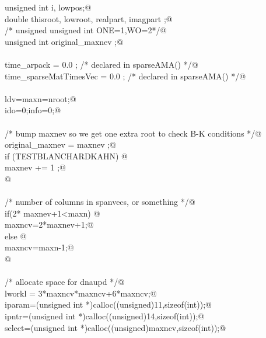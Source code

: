 \documentclass[12pt]{article}
\begin{document}
\begin{flushleft}
\begin{minipage}{\linewidth}
\begin{list}{}{}
\mbox{}\verb@        unsigned int i, lowpos;@\\
\mbox{}\verb@        double thisroot, lowroot, realpart, imagpart ;@\\
\mbox{}\verb@/*      unsigned unsigned int ONE=1,WO=2*/@\\
\mbox{}\verb@        unsigned int original_maxnev ;@\\
\mbox{}\verb@@\\
\mbox{}\verb@        time_arpack = 0.0 ;                             /* declared in sparseAMA() */@\\
\mbox{}\verb@        time_sparseMatTimesVec = 0.0 ;  /* declared in sparseAMA() */@\\
\mbox{}\verb@@\\
\mbox{}\verb@        ldv=maxn=nroot;@\\
\mbox{}\verb@        ido=0;info=0;@\\
\mbox{}\verb@@\\
\mbox{}\verb@        /* bump maxnev so we get one extra root to check B-K conditions */@\\
\mbox{}\verb@        original_maxnev = maxnev ;@\\
\mbox{}\verb@        if (TESTBLANCHARDKAHN) {@\\
\mbox{}\verb@                maxnev += 1 ;@\\
\mbox{}\verb@        }@\\
\mbox{}\verb@@\\
\mbox{}\verb@        /* number of columns in spanvecs, or something */@\\
\mbox{}\verb@        if(2* maxnev+1<maxn) {@\\
\mbox{}\verb@                maxncv=2*maxnev+1;@\\
\mbox{}\verb@        } else {@\\
\mbox{}\verb@                maxncv=maxn-1;@\\
\mbox{}\verb@        }@\\
\mbox{}\verb@@\\
\mbox{}\verb@        /* allocate space for dnaupd */@\\
\mbox{}\verb@        lworkl = 3*maxncv*maxncv+6*maxncv;@\\
\mbox{}\verb@        iparam=(unsigned int *)calloc((unsigned)11,sizeof(int));@\\
\mbox{}\verb@        ipntr=(unsigned int *)calloc((unsigned)14,sizeof(int));@\\
\mbox{}\verb@        select=(unsigned int *)calloc((unsigned)maxncv,sizeof(int));@\\

\end{list}
\end{minipage}
\end{flushleft}
\end{document}
